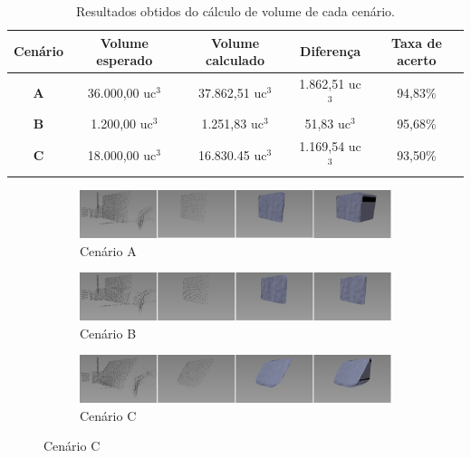 \begin{table}[H]
    \centering
    \caption{Resultados obtidos do cálculo de volume de cada cenário.}
    \begin{tabular}{@{}ccccc@{}}
        \toprule
        \textbf{Cenário} & \textbf{Volume esperado} & \textbf{Volume calculado} & \textbf{Diferença} & \textbf{Taxa de acerto} \\ \midrule
        \textbf{A} & 36.000,00 uc$^3$ & 37.862,51 uc$^3$ & 1.862,51 uc$^3$ & 94,83\% \\
        \textbf{B} & 1.200,00 uc$^3$ & 1.251,83 uc$^3$ & 51,83 uc$^3$ & 95,68\% \\
        \textbf{C} & 18.000,00 uc$^3$ & 16.830.45 uc$^3$ & 1.169,54 uc$^3$ & 93,50\% \\ \bottomrule
    \end{tabular}
    \label{tab:tabela_result_cenarios_vol}
\end{table}

\begin{figure}[H]
    \centering
    \caption{Reconstrução dos cenários em simulação virtual.}
    \label{fig:recontrucao_virtual}
    \begin{subfigure}[t]{\textwidth}
        \includegraphics[width=\textwidth]{dados/figuras/wall3.png}
        \caption{Cenário A}
    \end{subfigure}
    \begin{subfigure}[t]{\textwidth}
        \includegraphics[width=\textwidth]{dados/figuras/wall.png}
        \caption{Cenário B}
    \end{subfigure}
    \begin{subfigure}[t]{\textwidth}
        \includegraphics[width=\textwidth]{dados/figuras/declined.png}
        \caption{Cenário C}
    \end{subfigure}
\end{figure}

